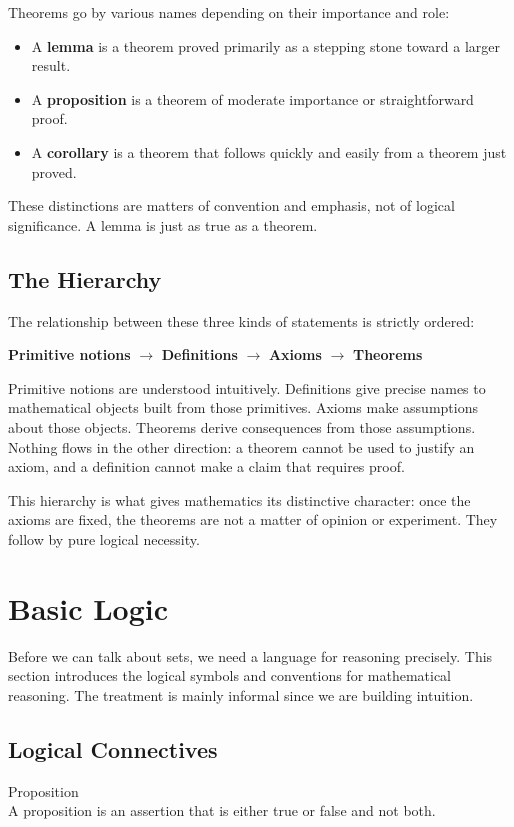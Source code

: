 \documentclass[a4paper]{article}
\begin{document}
Theorems go by various names depending on their importance and role:
\begin{itemize}
  \item A \textbf{lemma} is a theorem proved primarily as a stepping stone
  toward a larger result.
  \item A \textbf{proposition} is a theorem of moderate importance or
  straightforward proof.
  \item A \textbf{corollary} is a theorem that follows quickly and easily
  from a theorem just proved.
\end{itemize}
These distinctions are matters of convention and emphasis, not of logical
significance. A lemma is just as true as a theorem.

\subsection*{The Hierarchy}

The relationship between these three kinds of statements is strictly ordered:

\begin{center}
\textbf{Primitive notions} $\longrightarrow$ \textbf{Definitions}
$\longrightarrow$ \textbf{Axioms} $\longrightarrow$ \textbf{Theorems}
\end{center}

Primitive notions are understood intuitively. Definitions give precise names
to mathematical objects built from those primitives. Axioms make assumptions
about those objects. Theorems derive consequences from those assumptions.
Nothing flows in the other direction: a theorem cannot be used to justify an
axiom, and a definition cannot make a claim that requires proof.

This hierarchy is what gives mathematics its distinctive character: once the
axioms are fixed, the theorems are not a matter of opinion or experiment.
They follow by pure logical necessity.

\pagebreak
\section{Basic Logic}
Before we can talk about sets, we need a language for reasoning precisely. This section introduces the logical symbols and conventions for mathematical reasoning. The treatment is mainly informal since we are building intuition. 

\subsection{Logical Connectives}
\begin{defn}{Proposition}{}\\
A proposition is an assertion that is either true or false and not both. 
\end{defn}
\end{document}
